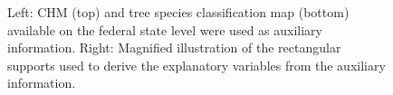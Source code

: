 \begin{figure}[H]
	\centering
	\caption{Left: CHM (top) and tree species classification map (bottom) available on the federal state level were used as auxiliary information. Right: Magnified illustration of the rectangular supports used to derive the explanatory variables from the auxiliary information.}
	\label{fig:Auxvars}
\end{figure}


